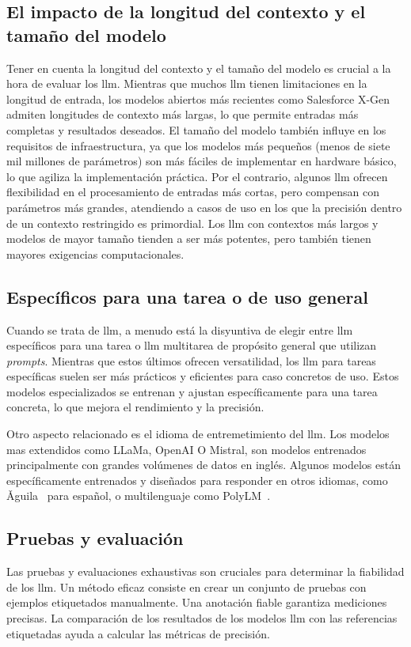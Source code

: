 \subsection{El impacto de la longitud del contexto y el tamaño del modelo}
Tener en cuenta la longitud del contexto y el tamaño del modelo es crucial a la hora de evaluar los \acrshort{llm}. Mientras que muchos \acrshort{llm} tienen limitaciones en la longitud de entrada, los modelos abiertos más recientes como Salesforce X-Gen admiten longitudes de contexto más largas, lo que permite entradas más completas y resultados deseados. El tamaño del modelo también influye en los requisitos de infraestructura, ya que los modelos más pequeños (menos de siete mil millones de parámetros) son más fáciles de implementar en hardware básico, lo que agiliza la implementación práctica. Por el contrario, algunos \acrshort{llm} ofrecen flexibilidad en el procesamiento de entradas más cortas, pero compensan con parámetros más grandes, atendiendo a casos de uso en los que la precisión dentro de un contexto restringido es primordial. Los \acrshort{llm} con contextos más largos y modelos de mayor tamaño tienden a ser más potentes, pero también tienen mayores exigencias computacionales.

\subsection{Específicos para una tarea o de uso general}
Cuando se trata de \acrfull{llm}, a menudo está la disyuntiva de elegir entre \acrshort{llm} específicos para una tarea o \acrshort{llm} multitarea de propósito general que utilizan \textit{prompts}. Mientras que estos últimos ofrecen versatilidad, los \acrshort{llm} para tareas específicas suelen ser más prácticos y eficientes para caso concretos de uso. Estos modelos especializados se entrenan y ajustan específicamente para una tarea concreta, lo que mejora el rendimiento y la precisión. 

Otro aspecto relacionado es el idioma de entremetimiento del \acrshort{llm}. Los modelos mas extendidos como LLaMa, OpenAI O Mistral, son modelos entrenados principalmente con grandes volúmenes de datos en inglés. Algunos modelos están específicamente entrenados y diseñados para responder en otros idiomas, como Ǎguila~\cite{Ǎguila} para español, o multilenguaje como PolyLM~\cite{wei2023polylm}.

\subsection{Pruebas y evaluación}
Las pruebas y evaluaciones exhaustivas son cruciales para determinar la fiabilidad de los \acrshort{llm}. Un método eficaz consiste en crear un conjunto de pruebas con ejemplos etiquetados manualmente. Una anotación fiable garantiza mediciones precisas. La comparación de los resultados de los modelos \acrshort{llm} con las referencias etiquetadas ayuda a calcular las métricas de precisión. 

